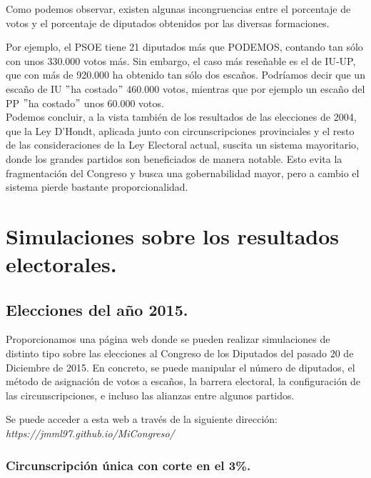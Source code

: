 \documentclass[11pt]{article}
\newcommand\console[1]{{\inconsolata #1}}
\begin{document}

	
		\enlargethispage{2\baselineskip}
	Como podemos observar, existen algunas incongruencias entre el porcentaje de votos y el porcentaje de diputados obtenidos por las diversas formaciones.
	
	Por ejemplo, el PSOE tiene 21 diputados más que PODEMOS, contando tan sólo con unos 330.000 votos más. Sin embargo, el caso más reseñable es el de IU-UP, que con más de 920.000 ha obtenido tan sólo dos escaños. Podríamos decir que un escaño de IU $"$ha costado$"$  460.000 votos, mientras que por ejemplo un escaño del PP $"$ha costado$"$ unos 60.000 votos.\\
	
	Podemos concluir, a la vista también de los resultados de las elecciones de 2004, que la Ley D'Hondt, aplicada junto con circunscripciones provinciales y el resto de las consideraciones de la Ley Electoral actual, suscita un sistema mayoritario, donde los grandes partidos son beneficiados de manera notable. Esto evita la fragmentación del Congreso y busca una gobernabilidad mayor, pero a cambio el sistema pierde bastante proporcionalidad.
	
	
	\section{Simulaciones sobre los resultados electorales.}
	\subsection{Elecciones del año 2015.}
	
	Proporcionamos una página web donde se pueden realizar simulaciones de distinto tipo sobre las elecciones al Congreso de los Diputados del pasado 20 de Diciembre de 2015. En concreto, se puede manipular el número de diputados, el método de asignación de votos a escaños, la barrera electoral, la configuración de las circunscripciones, e incluso las alianzas entre algunos partidos.
	
	Se puede acceder a esta web a través de la siguiente dirección:\\
	
	\vspace{-1em}
	\console{\textit{https://jmml97.github.io/MiCongreso/}}
	
	\subsubsection{Circunscripción única con corte en el 3\%.}
	
\end{document}
